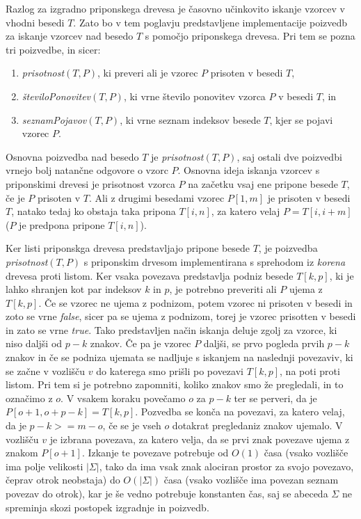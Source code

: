 Razlog za izgradno priponskega drevesa je časovno učinkovito iskanje vzorcev v vhodni besedi $T$. Zato bo v tem poglavju predstavljene implementacije poizvedb za iskanje vzorcev nad besedo $T$ s pomočjo priponskega drevesa. Pri tem se pozna tri poizvedbe, in sicer:
\begin{enumerate}
    \item \textit{prisotnost}$(T,P)$, ki preveri ali je vzorec $P$ prisoten v besedi $T$,
    \item \textit{številoPonovitev}$(T,P)$, ki vrne število ponovitev vzorca $P$ v besedi $T$, in
    \item \textit{seznamPojavov}$(T,P)$, ki vrne seznam indeksov besede $T$, kjer se pojavi vzorec $P$.
\end{enumerate}

Osnovna poizvedba nad besedo $T$ je \textit{prisotnost}$(T,P)$, saj ostali dve poizvedbi vrnejo bolj natančne odgovore o vzorc $P$. Osnovna ideja iskanja vzorcev s priponskimi drevesi je prisotnost vzorca $P$ na začetku vsaj ene pripone besede $T$, če je $P$ prisoten v $T$. Ali z drugimi besedami vzorec $P[1,m]$ je prisoten v besedi $T$, natako tedaj ko obstaja taka pripona $T[i,n]$, za katero velaj $P=T[i,i+m]$ ($P$ je predpona pripone $T[i,n]$). 

Ker listi priponskga drevesa predstavljajo pripone besede $T$, je poizvedba \textit{prisotnost}$(T,P)$ s priponskim drvesom implementirana s sprehodom iz \textit{korena} drevesa proti listom. Ker vsaka povezava predstavlja podniz besede $T[k,p]$, ki je lahko shranjen kot par indeksov $k$ in $p$, je potrebno preveriti ali $P$ ujema z $T[k,p]$. Če se vzorec ne ujema z podnizom, potem vzorec ni prisoten v besedi in zoto se vrne \textit{false}, sicer pa se ujema z podnizom, torej je vzorec prisotten v besedi in zato se vrne \textit{true}. Tako predstavljen način iskanja deluje zgolj za vzorce, ki niso daljši od $p-k$ znakov. Če pa je vzorec $P$ daljši, se prvo pogleda prvih $p-k$ znakov in če se podniza ujemata se nadljuje s iskanjem na naslednji povezaviv, ki se začne v vozlišču $v$ do katerega smo prišli po povezavi $T[k,p]$, na poti proti listom. Pri tem si je potrebno zapomniti, koliko znakov smo že pregledali, in to označimo z $o$. V vsakem koraku povečamo $o$ za $p-k$ ter se perveri, da je $P[o+1,o+p-k]=T[k,p]$. Pozvedba se konča na povezavi, za katero velaj, da je $p-k>=m-o$, če se je vseh $o$ dotakrat pregledaniz znakov ujemalo. V vozlišču $v$ je izbrana povezava, za katero velja, da se prvi znak povezave ujema z znakom $P[o+1]$. Izkanje te povezave potrebuje od $O(1)$ časa (vsako vozlišče ima polje velikosti $|\Sigma|$, tako da ima vsak znak alociran prostor za svojo povezavo, čeprav otrok neobstaja) do $O(|\Sigma|)$ časa (vsako vozlišče ima povezan seznam povezav do otrok), kar je še vedno potrebuje konstanten čas, saj se abeceda $\Sigma$ ne spreminja skozi postopek izgradnje in poizvedb.

